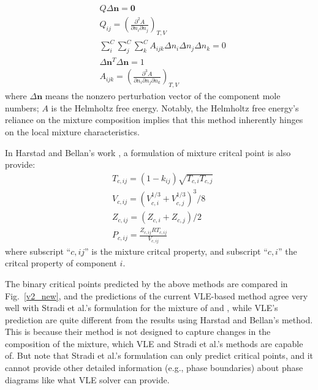     \begin{align}
         & Q\Delta \mathbf n=\mathbf0                                                                          \\
         & Q_{ij}=\left( \frac{\partial^2A}{\partial n_i \partial n_j}\right)_{T,V}                            \\
         & \sum_i^{C}\sum_{j}^{C}\sum_{k}^{C}A_{ijk}\Delta n_i\Delta n_{j}\Delta n_{k}=0                       \\
         & \Delta \mathbf n^{T}\Delta \mathbf n=1                                                              \\
         & A_{ijk}=\left( \frac{\partial^3A}{\partial n_i \partial n_j\partial n_k}\right)_{T,V} \label{eq:19}
    \end{align}
    where $\Delta \mathbf n$ means the nonzero perturbation vector of the component mole numbers; $A$ is the Helmholtz free energy. Notably, the Helmholtz free energy's reliance on the mixture composition implies that this method inherently hinges on the local mixture characteristics.

In Harstad and Bellan's work \cite{harstad2004mixing}, a formulation of mixture critcal point is also provide:
      \begin{align}
         & T_{c,ij}=(1-k_{ij})\sqrt{T_{c,i}T_{c,j}}  \\
         & V_{c,ij}= \left(V_{c,i}^{1/3}+V_{c,j}^{1/3}\right)^3/8 \\
         & Z_{c,ij}=\left(Z_{c,i}+Z_{c,j}\right)/2   \\
         & P_{c,ij}= \frac{Z_{c,ij}RT_{c,ij}}{V_{c,ij}} 
    \end{align}
where subscript ``$c,ij$'' is the mixture critcal property, and subscript ``$c,i$'' the critcal property of component $i$.
    
    
    The binary critical points predicted by the above methods are compared in Fig.~\ref{v2_new}, and the predictions of the current VLE-based method agree very well with Stradi et al.'s formulation \cite{stradi2001reliable} for the mixture of  and , while VLE's prediction are quite different from the results using Harstad and Bellan's method. This is because their method is not designed to capture changes in the composition of the mixture, which VLE and Stradi et al.'s methods are capable of. But note that Stradi et al.'s formulation can only predict critical points, and it cannot provide other detailed information (e.g., phase boundaries) about phase diagrams like what VLE solver can provide.


